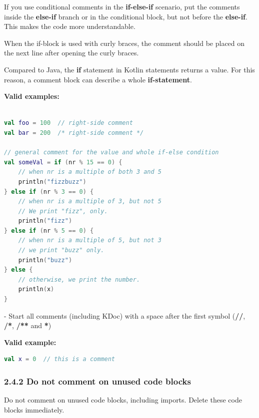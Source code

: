 {{{{{{{{{{{{{{{{If you use conditional comments in the \textbf{if-else-if} scenario, put the comments inside the \textbf{else-if} branch or in the conditional block, but not before the \textbf{else-if}. This makes the code more understandable.

When the if-block is used with curly braces, the comment should be placed on the next line after opening the curly braces.

Compared to Java, the \textbf{if} statement in Kotlin statements returns a value. For this reason, a comment block can describe a whole \textbf{if-statement}.



\textbf{Valid examples:}



\begin{lstlisting}[language=Kotlin]

val foo = 100  // right-side comment
val bar = 200  /* right-side comment */

// general comment for the value and whole if-else condition
val someVal = if (nr % 15 == 0) {
    // when nr is a multiple of both 3 and 5
    println("fizzbuzz")
} else if (nr % 3 == 0) {
    // when nr is a multiple of 3, but not 5
    // We print "fizz", only.
    println("fizz")
} else if (nr % 5 == 0) {
    // when nr is a multiple of 5, but not 3
    // we print "buzz" only.
    println("buzz")
} else {
    // otherwise, we print the number.
    println(x)
}
\end{lstlisting}


- Start all comments (including KDoc) with a space after the first symbol (\textbf{//}, \textbf{/*}, \textbf{/**} and \textbf{*})



\textbf{Valid example:}



\begin{lstlisting}[language=Kotlin]
val x = 0  // this is a comment
\end{lstlisting}


\subsubsection*{\textbf{2.4.2 Do not comment on unused code blocks}}
\leavevmode\newline

\label{sec:2.4.2}



Do not comment on unused code blocks, including imports. Delete these code blocks immediately.

}}}}}}}}}}}}}}}}

